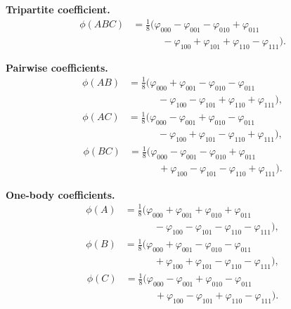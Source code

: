\documentclass[
  aps,
  pra,
  reprint,            %
  superscriptaddress, %
  amsmath,amssymb,
  notitlepage
]{revtex4-2}
\begin{document}
\medskip
\noindent\textbf{Tripartite coefficient.}
\begin{equation}
\boxed{
\begin{aligned}
\phi(ABC)
&=\frac{1}{8}\Big(
\varphi_{000}-\varphi_{001}-\varphi_{010}+\varphi_{011}\\
&\qquad\quad
-\varphi_{100}+\varphi_{101}+\varphi_{110}-\varphi_{111}
\Big).
\end{aligned}
}
\end{equation}

\medskip
\noindent\textbf{Pairwise coefficients.}
\begin{equation}
\boxed{
\begin{aligned}
\phi(AB)
&=\frac{1}{8}\Big(
\varphi_{000}+\varphi_{001}-\varphi_{010}-\varphi_{011}\\
&\qquad\quad
-\varphi_{100}-\varphi_{101}+\varphi_{110}+\varphi_{111}
\Big),
\end{aligned}
}
\end{equation}
\begin{equation}
\boxed{
\begin{aligned}
\phi(AC)
&=\frac{1}{8}\Big(
\varphi_{000}-\varphi_{001}+\varphi_{010}-\varphi_{011}\\
&\qquad\quad
-\varphi_{100}+\varphi_{101}-\varphi_{110}+\varphi_{111}
\Big),
\end{aligned}
}
\end{equation}
\begin{equation}
\boxed{
\begin{aligned}
\phi(BC)
&=\frac{1}{8}\Big(
\varphi_{000}-\varphi_{001}-\varphi_{010}+\varphi_{011}\\
&\qquad\quad
+\varphi_{100}-\varphi_{101}-\varphi_{110}+\varphi_{111}
\Big).
\end{aligned}
}
\end{equation}

\medskip
\noindent\textbf{One-body coefficients.}
\begin{equation}
\boxed{
\begin{aligned}
\phi(A)
&=\frac{1}{8}\Big(
\varphi_{000}+\varphi_{001}+\varphi_{010}+\varphi_{011}\\
&\qquad\quad
-\varphi_{100}-\varphi_{101}-\varphi_{110}-\varphi_{111}
\Big),
\end{aligned}
}
\end{equation}
\begin{equation}
\boxed{
\begin{aligned}
\phi(B)
&=\frac{1}{8}\Big(
\varphi_{000}+\varphi_{001}-\varphi_{010}-\varphi_{011}\\
&\qquad\quad
+\varphi_{100}+\varphi_{101}-\varphi_{110}-\varphi_{111}
\Big),
\end{aligned}
}
\end{equation}
\begin{equation}
\boxed{
\begin{aligned}
\phi(C)
&=\frac{1}{8}\Big(
\varphi_{000}-\varphi_{001}+\varphi_{010}-\varphi_{011}\\
&\qquad\quad
+\varphi_{100}-\varphi_{101}+\varphi_{110}-\varphi_{111}
\Big).
\end{aligned}
}
\end{equation}



\end{document}
